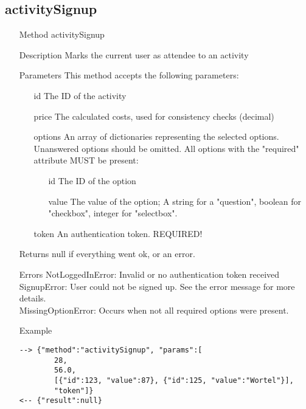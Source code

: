\documentclass[a4paper]{scrreprt}
\begin{document}
\clearpage

\subsection{activitySignup}
\begin{enumerate}
\item[Method] activitySignup
\item[Description] Marks the current user as attendee to an activity
\item[Parameters] This method accepts the following parameters:
	\begin{enumerate}
		\item[id] The ID of the activity
        \item[price] The calculated costs, used for consistency checks (decimal)
        \item[options] An array of dictionaries representing the selected options. Unanswered options should be omitted. All options with the "required" attribute MUST be present:
        	\begin{enumerate}
            	\item[id] The ID of the option
                \item[value] The value of the option; A string for a "question", boolean for "checkbox", integer for "selectbox".
            \end{enumerate}
        \item[token] An authentication token. REQUIRED!
    \end{enumerate}
\item[Returns] null if everything went ok, or an error.
\item[Errors] 
	NotLoggedInError: Invalid or no authentication token received \\
	SignupError: User could not be signed up. See the error message for more details. \\
    MissingOptionError: Occurs when not all required options were present.
\item[Example]
\begin{lstlisting}
--> {"method":"activitySignup", "params":[
        28, 
        56.0,
        [{"id":123, "value":87}, {"id":125, "value":"Wortel"}],
        "token"]}
<-- {"result":null}
\end{lstlisting}
\end{enumerate}
\end{document}
